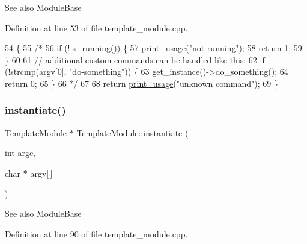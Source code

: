 \begin{DoxySeeAlso}{See also}
Module\+Base 
\end{DoxySeeAlso}


Definition at line 53 of file template\+\_\+module.\+cpp.


\begin{DoxyCode}
54 \{
55     \textcolor{comment}{/*}
56 \textcolor{comment}{    if (!is\_running()) \{}
57 \textcolor{comment}{        print\_usage("not running");}
58 \textcolor{comment}{        return 1;}
59 \textcolor{comment}{    \}}
60 \textcolor{comment}{}
61 \textcolor{comment}{    // additional custom commands can be handled like this:}
62 \textcolor{comment}{    if (!strcmp(argv[0], "do-something")) \{}
63 \textcolor{comment}{        get\_instance()->do\_something();}
64 \textcolor{comment}{        return 0;}
65 \textcolor{comment}{    \}}
66 \textcolor{comment}{     */}
67 
68     \textcolor{keywordflow}{return} \hyperlink{classTemplateModule_a5ce5da37ebb624d8fbf301343d0ed341}{print\_usage}(\textcolor{stringliteral}{"unknown command"});
69 \}
\end{DoxyCode}
\mbox{\label{classTemplateModule_aa31cbf48b351f5ee0b33b3cbd5b8e536}} 
\subsubsection{\texorpdfstring{instantiate()}{instantiate()}}
{\footnotesize\ttfamily \hyperlink{classTemplateModule}{Template\+Module} $\ast$ Template\+Module\+::instantiate (\begin{DoxyParamCaption}\item[{int}]{argc,  }\item[{char $\ast$}]{argv\mbox{[}$\,$\mbox{]} }\end{DoxyParamCaption})\hspace{0.3cm}{\ttfamily [static]}}

\begin{DoxySeeAlso}{See also}
Module\+Base 
\end{DoxySeeAlso}


Definition at line 90 of file template\+\_\+module.\+cpp.


